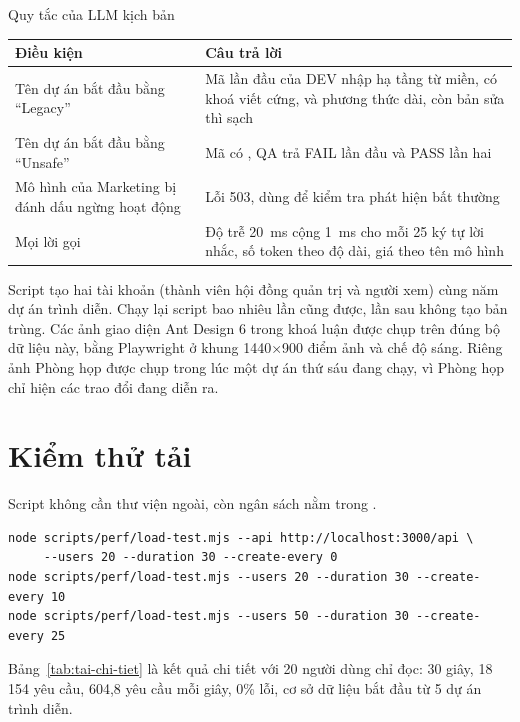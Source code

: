 \begin{table}{Quy tắc của LLM kịch bản}
\label{tab:kich-ban}
\small
\begin{tabularx}{\textwidth}{|P{5cm}|L|}
\hline
\textbf{Điều kiện} & \textbf{Câu trả lời} \\ \hline
Tên dự án bắt đầu bằng ``Legacy'' & Mã lần đầu của DEV nhập hạ tầng từ miền, có khoá viết cứng,  và phương thức dài, còn bản sửa thì sạch \\ \hline
Tên dự án bắt đầu bằng ``Unsafe'' & Mã có , QA trả FAIL lần đầu và PASS lần hai \\ \hline
Mô hình của Marketing bị đánh dấu ngừng hoạt động & Lỗi 503, dùng để kiểm tra phát hiện bất thường \\ \hline
Mọi lời gọi & Độ trễ 20~ms cộng 1~ms cho mỗi 25 ký tự lời nhắc, số token theo độ dài, giá theo tên mô hình \\ \hline
\end{tabularx}
\end{table}

Script  tạo hai tài khoản (thành viên hội đồng quản trị và người xem) cùng năm dự án trình diễn. Chạy lại script bao nhiêu lần cũng được, lần sau không tạo bản trùng. Các ảnh giao diện Ant Design 6 trong khoá luận được chụp trên đúng bộ dữ liệu này, bằng Playwright ở khung 1440×900 điểm ảnh và chế độ sáng. Riêng ảnh Phòng họp được chụp trong lúc một dự án thứ sáu đang chạy, vì Phòng họp chỉ hiện các trao đổi đang diễn ra.

\section{Kiểm thử tải}

Script  không cần thư viện ngoài, còn ngân sách nằm trong .

\begin{Verbatim}
node scripts/perf/load-test.mjs --api http://localhost:3000/api \
     --users 20 --duration 30 --create-every 0
node scripts/perf/load-test.mjs --users 20 --duration 30 --create-every 10
node scripts/perf/load-test.mjs --users 50 --duration 30 --create-every 25
\end{Verbatim}

Bảng~\ref{tab:tai-chi-tiet} là kết quả chi tiết với 20 người dùng chỉ đọc: 30 giây, 18\,154 yêu cầu, 604,8 yêu cầu mỗi giây, 0\% lỗi, cơ sở dữ liệu bắt đầu từ 5 dự án trình diễn.

